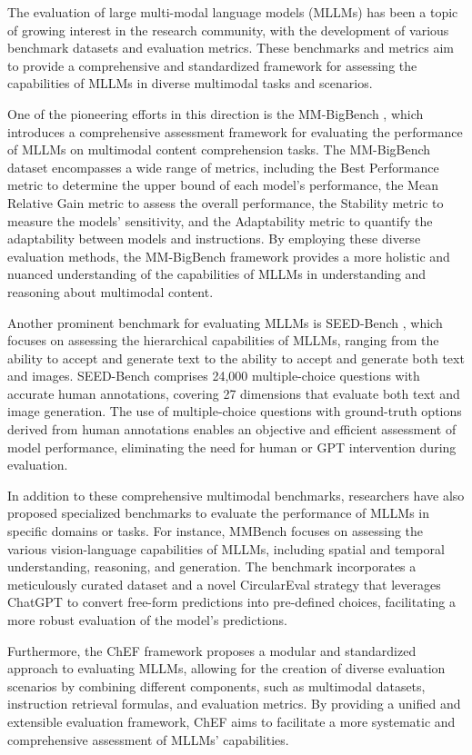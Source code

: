 \documentclass[11pt]{article}
\begin{document}
The evaluation of large multi-modal language models (MLLMs) has been a topic of growing interest in the research community, with the development of various benchmark datasets and evaluation metrics. These benchmarks and metrics aim to provide a comprehensive and standardized framework for assessing the capabilities of MLLMs in diverse multimodal tasks and scenarios.

One of the pioneering efforts in this direction is the MM-BigBench \cite{ref51}, which introduces a comprehensive assessment framework for evaluating the performance of MLLMs on multimodal content comprehension tasks. The MM-BigBench dataset encompasses a wide range of metrics, including the Best Performance metric to determine the upper bound of each model's performance, the Mean Relative Gain metric to assess the overall performance, the Stability metric to measure the models' sensitivity, and the Adaptability metric to quantify the adaptability between models and instructions. By employing these diverse evaluation methods, the MM-BigBench framework provides a more holistic and nuanced understanding of the capabilities of MLLMs in understanding and reasoning about multimodal content.

Another prominent benchmark for evaluating MLLMs is SEED-Bench \cite{ref146}, which focuses on assessing the hierarchical capabilities of MLLMs, ranging from the ability to accept and generate text to the ability to accept and generate both text and images. SEED-Bench comprises 24,000 multiple-choice questions with accurate human annotations, covering 27 dimensions that evaluate both text and image generation. The use of multiple-choice questions with ground-truth options derived from human annotations enables an objective and efficient assessment of model performance, eliminating the need for human or GPT intervention during evaluation.

In addition to these comprehensive multimodal benchmarks, researchers have also proposed specialized benchmarks to evaluate the performance of MLLMs in specific domains or tasks. For instance, MMBench \cite{ref55} focuses on assessing the various vision-language capabilities of MLLMs, including spatial and temporal understanding, reasoning, and generation. The benchmark incorporates a meticulously curated dataset and a novel CircularEval strategy that leverages ChatGPT to convert free-form predictions into pre-defined choices, facilitating a more robust evaluation of the model's predictions.

Furthermore, the ChEF \cite{ref54} framework proposes a modular and standardized approach to evaluating MLLMs, allowing for the creation of diverse evaluation scenarios by combining different components, such as multimodal datasets, instruction retrieval formulas, and evaluation metrics. By providing a unified and extensible evaluation framework, ChEF aims to facilitate a more systematic and comprehensive assessment of MLLMs' capabilities.
\end{document}
